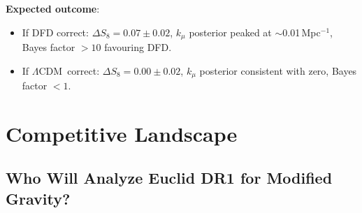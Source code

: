 \documentclass[11pt,a4paper]{article}
\newcommand{\LCDM}{$\Lambda$CDM}
\newcommand{\kmu}{k_\mu}
\begin{document}
\begin{granitebox}
\textbf{Expected outcome}:
\begin{itemize}[nosep]
\item If DFD correct: $\Delta S_8 = 0.07 \pm 0.02$, $\kmu$ posterior
  peaked at $\sim$0.01\,Mpc$^{-1}$, Bayes factor $> 10$ favouring DFD.
\item If \LCDM\ correct: $\Delta S_8 = 0.00 \pm 0.02$, $\kmu$ posterior
  consistent with zero, Bayes factor $< 1$.
\end{itemize}

\end{granitebox}


\section{Competitive Landscape}
\label{sec:competition}

\subsection{Who Will Analyze Euclid DR1 for Modified Gravity?}
\end{document}
